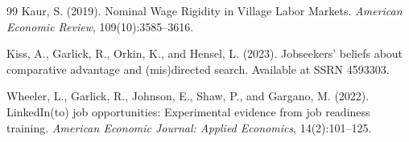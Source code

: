 \documentclass[12pt]{article}
\begin{document}
\begin{thebibliography}{99}
Kaur, S. (2019).
Nominal Wage Rigidity in Village Labor Markets.
\textit{American Economic Review}, 109(10):3585--3616.

Kiss, A., Garlick, R., Orkin, K., and Hensel, L. (2023).
Jobseekers' beliefs about comparative advantage and (mis)directed search.
Available at SSRN 4593303.

Wheeler, L., Garlick, R., Johnson, E., Shaw, P., and Gargano, M. (2022).
LinkedIn(to) job opportunities: Experimental evidence from job readiness training.
\textit{American Economic Journal: Applied Economics}, 14(2):101--125.

\end{thebibliography}
\end{document}

